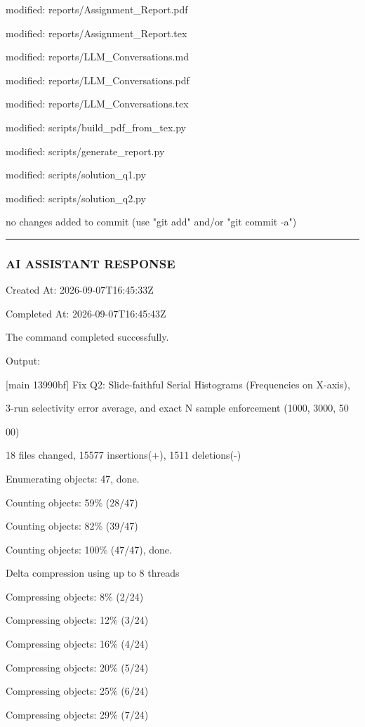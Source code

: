 \documentclass[11pt,a4paper]{article}
\begin{document}
modified:   reports/Assignment\_Report.pdf

modified:   reports/Assignment\_Report.tex

modified:   reports/LLM\_Conversations.md

modified:   reports/LLM\_Conversations.pdf

modified:   reports/LLM\_Conversations.tex

modified:   scripts/build\_pdf\_from\_tex.py

modified:   scripts/generate\_report.py

modified:   scripts/solution\_q1.py

modified:   scripts/solution\_q2.py


no changes added to commit (use "git add" and/or "git commit -a")


\hrule

\subsubsection{AI ASSISTANT RESPONSE}

Created At: 2026-09-07T16:45:33Z

Completed At: 2026-09-07T16:45:43Z


The command completed successfully.

Output:

[main 13990bf] Fix Q2: Slide-faithful Serial Histograms (Frequencies on X-axis),

3-run selectivity error average, and exact N sample enforcement (1000, 3000, 50

00)

18 files changed, 15577 insertions(+), 1511 deletions(-)

Enumerating objects: 47, done.

Counting objects:  59\% (28/47)

Counting objects:  82\% (39/47)

Counting objects: 100\% (47/47), done.

Delta compression using up to 8 threads

Compressing objects:   8\% (2/24)

Compressing objects:  12\% (3/24)

Compressing objects:  16\% (4/24)

Compressing objects:  20\% (5/24)

Compressing objects:  25\% (6/24)

Compressing objects:  29\% (7/24)
\end{document}
